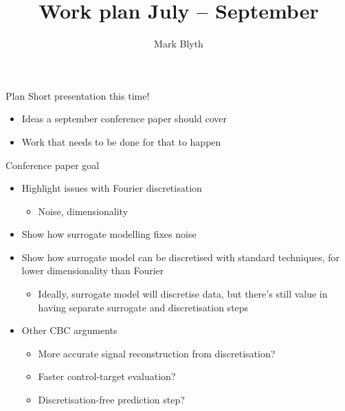 \documentclass[presentation]{beamer}
\author{Mark Blyth}
\date{}
\title{Work plan July -- September}
\begin{document}
\maketitle

\begin{frame}[label={sec:orgef771ca}]{Plan}
Short presentation this time!
\begin{itemize}
\item Ideas a september conference paper should cover
\item Work that needs to be done for that to happen
\end{itemize}
\end{frame}

\begin{frame}[label={sec:org85fe5ac}]{Conference paper goal}
\begin{itemize}[<+->]
\item Highlight issues with Fourier discretisation
\begin{itemize}
\item Noise, dimensionality
\end{itemize}
\item Show how surrogate modelling fixes noise
\item Show how surrogate model can be discretised with standard techniques, for lower dimensionality than Fourier
\begin{itemize}
\item Ideally, surrogate model will discretise data, but there's still value in having separate surrogate and discretisation steps
\end{itemize}
\item Other CBC arguments
\begin{itemize}
\item More accurate signal reconstruction from discretisation?
\item Faster control-target evaluation?
\item Discretisation-free prediction step?
\end{itemize}
\end{itemize}
\end{frame}
\end{document}
